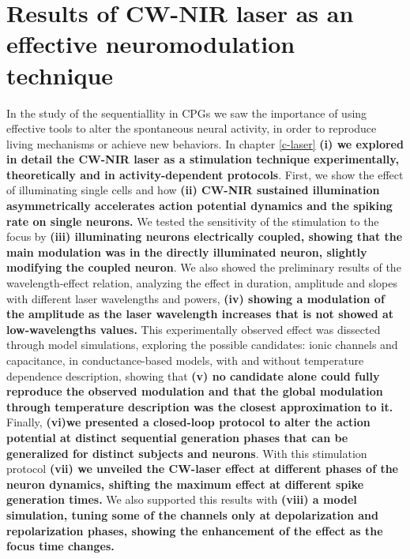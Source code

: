 \section{Results of CW-NIR laser as an effective neuromodulation technique}
In the study of the sequentiallity in CPGs we saw the importance of using effective tools to alter the spontaneous neural activity, in order to reproduce living mechanisms or achieve new behaviors. In chapter \ref{c-laser} \textbf{(i) we explored in detail the CW-NIR laser as a stimulation technique experimentally, theoretically and in activity-dependent protocols}. First, we show the effect of illuminating single cells and how \textbf{(ii) CW-NIR sustained illumination asymmetrically accelerates action potential dynamics and the spiking rate on single neurons.} We tested the sensitivity of the stimulation to the focus by \textbf{(iii) illuminating neurons electrically coupled, showing that the main modulation was in the directly illuminated neuron, slightly modifying the coupled neuron}. We also showed the preliminary results of the wavelength-effect relation, analyzing the effect in duration, amplitude and slopes with different laser wavelengths and powers, \textbf{(iv) showing a modulation of the amplitude as the laser wavelength increases that is not showed at low-wavelengths values.} This experimentally observed effect was dissected through model simulations, exploring the possible candidates: ionic channels and capacitance, in conductance-based models, with and without temperature dependence description, showing that \textbf{(v) no candidate alone could fully reproduce the observed modulation and that the global modulation through temperature description was the closest approximation to it.} Finally, \textbf{(vi)we presented a closed-loop protocol to alter the action potential at distinct sequential generation phases that can be generalized for distinct subjects and neurons}. With this stimulation protocol \textbf{(vii) we unveiled the CW-laser effect at different phases of the neuron dynamics, shifting the maximum effect at different spike generation times.} We also supported this results with \textbf{(viii) a model simulation, tuning some of the channels only at depolarization and repolarization phases, showing the enhancement of the effect as the focus time changes.}

